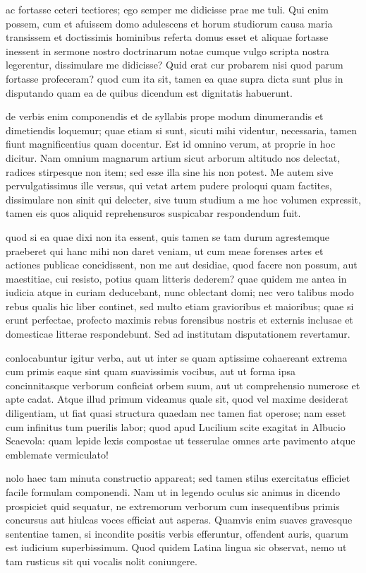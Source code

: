  ac fortasse ceteri tectiores; ego semper me didicisse prae me tuli. Qui enim possem, cum et afuissem domo adulescens et horum studiorum causa maria transissem et doctissimis hominibus referta domus esset et aliquae fortasse inessent in sermone nostro doctrinarum notae cumque vulgo scripta nostra legerentur, dissimulare me didicisse? Quid erat cur probarem nisi quod parum fortasse profeceram? quod cum ita sit, tamen ea quae supra dicta sunt plus in disputando quam ea de quibus dicendum est dignitatis habuerunt.

 de verbis enim componendis et de syllabis prope modum dinumerandis et dimetiendis loquemur; quae etiam si sunt, sicuti mihi videntur, necessaria, tamen fiunt magnificentius quam docentur. Est id omnino verum, at proprie in hoc dicitur. Nam omnium magnarum artium sicut arborum altitudo nos delectat, radices stirpesque non item; sed esse illa sine his non potest. Me autem sive pervulgatissimus ille versus, qui vetat artem pudere proloqui quam factites, dissimulare non sinit qui delecter, sive tuum studium a me hoc volumen expressit, tamen eis quos aliquid reprehensuros suspicabar respondendum fuit.

 quod si ea quae dixi non ita essent, quis tamen se tam durum agrestemque praeberet qui hanc mihi non daret veniam, ut cum meae forenses artes et actiones publicae concidissent, non me aut desidiae, quod facere non possum, aut maestitiae, cui resisto, potius quam litteris dederem? quae quidem me antea in iudicia atque in curiam deducebant, nunc oblectant domi; nec vero talibus modo rebus qualis hic liber continet, sed multo etiam gravioribus et maioribus; quae si erunt perfectae, profecto maximis rebus forensibus nostris et externis inclusae et domesticae litterae respondebunt. Sed ad institutam disputationem revertamur.

 conlocabuntur igitur verba, aut ut inter se quam aptissime cohaereant extrema cum primis eaque sint quam suavissimis vocibus, aut ut forma ipsa concinnitasque verborum conficiat orbem suum, aut ut comprehensio numerose et apte cadat. Atque illud primum videamus quale sit, quod vel maxime desiderat diligentiam, ut fiat quasi structura quaedam nec tamen fiat operose; nam esset cum infinitus tum puerilis labor; quod apud Lucilium scite exagitat in Albucio Scaevola: quam lepide lexis compostae ut tesserulae omnes arte pavimento atque emblemate vermiculato!

 nolo haec tam minuta constructio appareat; sed tamen stilus exercitatus efficiet facile formulam componendi. Nam ut in legendo oculus sic animus in dicendo prospiciet quid sequatur, ne extremorum verborum cum insequentibus primis concursus aut hiulcas voces efficiat aut asperas. Quamvis enim suaves gravesque sententiae tamen, si incondite positis verbis efferuntur, offendent auris, quarum est iudicium superbissimum. Quod quidem Latina lingua sic observat, nemo ut tam rusticus sit qui vocalis nolit coniungere.

